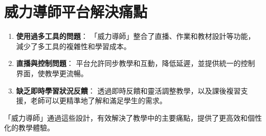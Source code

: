 \documentclass[12pt]{article}
\begin{document}
\section{威力導師平台解決痛點}

\begin{enumerate}[label=\textbf{\arabic*.}]
 
  \item \textbf{使用過多工具的問題}：
  「威力導師」整合了直播、作業和教材設計等功能，減少了多工具的複雜性和學習成本。
  \item \textbf{直播與控制問題}：
  平台允許同步教學和互動，降低延遲，並提供統一的控制界面，使教學更流暢。
   \item \textbf{缺乏即時學習狀況反饋}：
  透過即時反饋和靈活調整教學，以及課後複習支援，老師可以更精準地了解和滿足學生的需求。
\end{enumerate}

「威力導師」通過這些設計，有效解決了教學中的主要痛點，提供了更高效和個性化的教學體驗。
  
\end{document}

